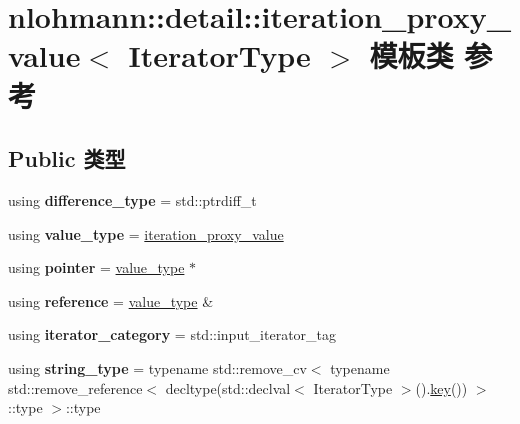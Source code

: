 \hypertarget{classnlohmann_1_1detail_1_1iteration__proxy__value}{}\section{nlohmann\+::detail\+::iteration\+\_\+proxy\+\_\+value$<$ Iterator\+Type $>$ 模板类 参考}
\label{classnlohmann_1_1detail_1_1iteration__proxy__value}
\subsection*{Public 类型}
\begin{DoxyCompactItemize}
\item 
\mbox{\label{classnlohmann_1_1detail_1_1iteration__proxy__value_ada6b4e6d55d8ed7ac79e49a03e9d1fe2}} 
using {\bfseries difference\+\_\+type} = std\+::ptrdiff\+\_\+t
\item 
\mbox{\label{classnlohmann_1_1detail_1_1iteration__proxy__value_a5e90a5810cc1bb6c1000eabbfdfe7b9e}} 
using {\bfseries value\+\_\+type} = \mbox{\hyperlink{classnlohmann_1_1detail_1_1iteration__proxy__value}{iteration\+\_\+proxy\+\_\+value}}
\item 
\mbox{\label{classnlohmann_1_1detail_1_1iteration__proxy__value_a44c64feee85b8e7164a05310e6418a4b}} 
using {\bfseries pointer} = \mbox{\hyperlink{classnlohmann_1_1detail_1_1iteration__proxy__value}{value\+\_\+type}} $\ast$
\item 
\mbox{\label{classnlohmann_1_1detail_1_1iteration__proxy__value_a5bc7d3133daab5ec4797f3132e093af8}} 
using {\bfseries reference} = \mbox{\hyperlink{classnlohmann_1_1detail_1_1iteration__proxy__value}{value\+\_\+type}} \&
\item 
\mbox{\label{classnlohmann_1_1detail_1_1iteration__proxy__value_a1ab8c44e3772c03651b5ad07216043cf}} 
using {\bfseries iterator\+\_\+category} = std\+::input\+\_\+iterator\+\_\+tag
\item 
\mbox{\label{classnlohmann_1_1detail_1_1iteration__proxy__value_a1fc63b88a585fa39942007aab69a74e6}} 
using {\bfseries string\+\_\+type} = typename std\+::remove\+\_\+cv$<$ typename std\+::remove\+\_\+reference$<$ decltype(std\+::declval$<$ Iterator\+Type $>$().\mbox{\hyperlink{classnlohmann_1_1detail_1_1iteration__proxy__value_af2949ac0d70212738030bfda29c5bcc2}{key}}()) $>$\+::type $>$\+::type
\end{DoxyCompactItemize}
